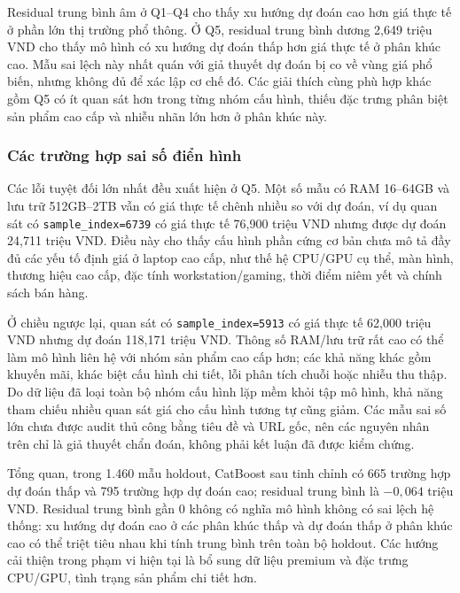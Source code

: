 Residual trung bình âm ở Q1--Q4 cho thấy xu hướng dự đoán cao hơn giá thực tế ở phần lớn thị trường phổ thông. Ở Q5, residual trung bình dương 2,649 triệu VND cho thấy mô hình có xu hướng dự đoán thấp hơn giá thực tế ở phân khúc cao. Mẫu sai lệch này nhất quán với giả thuyết dự đoán bị co về vùng giá phổ biến, nhưng không đủ để xác lập cơ chế đó. Các giải thích cùng phù hợp khác gồm Q5 có ít quan sát hơn trong từng nhóm cấu hình, thiếu đặc trưng phân biệt sản phẩm cao cấp và nhiễu nhãn lớn hơn ở phân khúc này.

\subsubsection{Các trường hợp sai số điển hình}



Các lỗi tuyệt đối lớn nhất đều xuất hiện ở Q5. Một số mẫu có RAM 16--64GB và lưu trữ 512GB--2TB vẫn có giá thực tế chênh nhiều so với dự đoán, ví dụ quan sát có \texttt{sample\_index=6739} có giá thực tế 76,900 triệu VND nhưng được dự đoán 24,711 triệu VND. Điều này cho thấy cấu hình phần cứng cơ bản chưa mô tả đầy đủ các yếu tố định giá ở laptop cao cấp, như thế hệ CPU/GPU cụ thể, màn hình, thương hiệu cao cấp, đặc tính workstation/gaming, thời điểm niêm yết và chính sách bán hàng.

Ở chiều ngược lại, quan sát có \texttt{sample\_index=5913} có giá thực tế 62,000 triệu VND nhưng dự đoán 118,171 triệu VND. Thông số RAM/lưu trữ rất cao có thể làm mô hình liên hệ với nhóm sản phẩm cao cấp hơn; các khả năng khác gồm khuyến mãi, khác biệt cấu hình chi tiết, lỗi phân tích chuỗi hoặc nhiễu thu thập. Do dữ liệu đã loại toàn bộ nhóm cấu hình lặp mềm khỏi tập mô hình, khả năng tham chiếu nhiều quan sát giá cho cấu hình tương tự cũng giảm. Các mẫu sai số lớn chưa được audit thủ công bằng tiêu đề và URL gốc, nên các nguyên nhân trên chỉ là giả thuyết chẩn đoán, không phải kết luận đã được kiểm chứng.

Tổng quan, trong 1.460 mẫu holdout, CatBoost sau tinh chỉnh có 665 trường hợp dự đoán thấp và 795 trường hợp dự đoán cao; residual trung bình là $-0,064$ triệu VND. Residual trung bình gần 0 không có nghĩa mô hình không có sai lệch hệ thống: xu hướng dự đoán cao ở các phân khúc thấp và dự đoán thấp ở phân khúc cao có thể triệt tiêu nhau khi tính trung bình trên toàn bộ holdout. Các hướng cải thiện trong phạm vi hiện tại là bổ sung dữ liệu premium và đặc trưng CPU/GPU, tình trạng sản phẩm chi tiết hơn.

